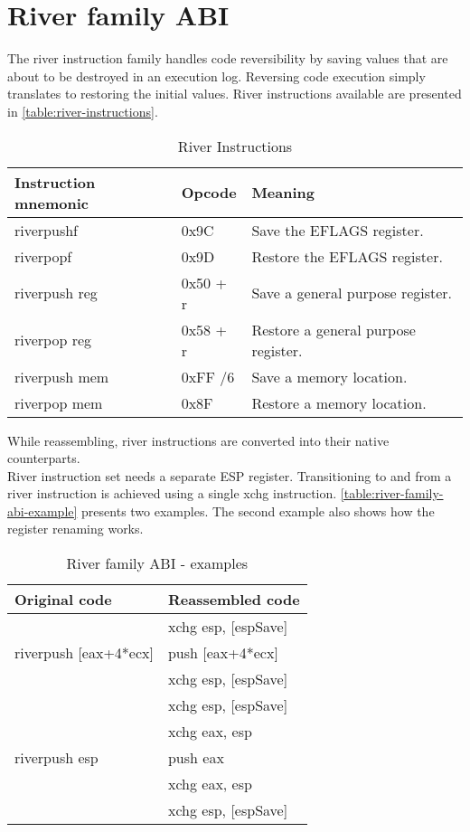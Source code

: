 \documentclass[12pt]{report}
\begin{document}
\section{River family ABI}
\label{sec:river-family-abi}
The river instruction family handles code reversibility by saving values that are about to be destroyed in an execution log. Reversing code execution simply translates to restoring the initial values. River instructions available are presented in \autoref{table:river-instructions}.\\
\begin{table}[H]
	\begin{tabular}{| l | l | l |}
		\hline
		\textbf{Instruction mnemonic} & \textbf{Opcode} & \textbf{Meaning} \\ \hline
		riverpushf & 0x9C & Save the EFLAGS register.\\ \hline
		riverpopf & 0x9D & Restore the EFLAGS register.\\ \hline
		riverpush reg & 0x50 + r & Save a general purpose register.\\ \hline
		riverpop reg & 0x58 + r & Restore a general purpose register.\\ \hline
		riverpush mem & 0xFF /6 & Save a memory location.\\ \hline
		riverpop mem & 0x8F & Restore a memory location.\\ \hline
	\end{tabular}
	\caption{River Instructions}
	\label{table:river-instructions}
\end{table}
While reassembling, river instructions are converted into their native counterparts.\\
\newline
River instruction set needs a separate ESP register. Transitioning to and from a river instruction is achieved using a single xchg instruction. \autoref{table:river-family-abi-example} presents two examples. The second example also shows how the register renaming works.\\
\begin{table}[H]
	\centering
	\begin{tabular}{| l | l |}
		\hline
		\textbf{Original code} & \textbf{Reassembled code}\\ \hline
		\multirow{3}{*}{riverpush [eax+4*ecx]} & xchg esp, [espSave]\\
		& push [eax+4*ecx]\\
		& xchg esp, [espSave]\\ \hline
		\multirow{5}{*}{riverpush esp} & xchg esp, [espSave]\\
		& xchg eax, esp\\
		& push eax\\
		& xchg eax, esp\\
		& xchg esp, [espSave]\\ \hline
	\end{tabular}
	\caption{River family ABI - examples}
	\label{table:river-family-abi-example}
\end{table}
\end{document}
